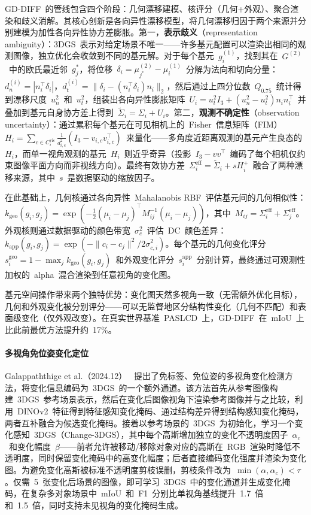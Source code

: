 GD-DIFF~的管线包含四个阶段：几何漂移建模、核评分（几何+外观）、聚合渲染和歧义消解。其核心创新是各向异性漂移模型，将几何漂移归因于两个来源并分别建模为加性各向异性协方差膨胀。第一，\textbf{表示歧义}（representation ambiguity）：3DGS~表示对给定场景不唯一——许多基元配置可以渲染出相同的观测图像，独立优化会收敛到不同的基元解。对于每个基元~$g_i^{(1)}$，找到其在~$G^{(2)}$~中的欧氏最近邻~$g_j^*$，将位移~$\delta_i = \mu_{j^*}^{(2)} - \mu_i^{(1)}$~分解为法向和切向分量：$d_n^{(i)} = |n_i^\top \delta_i|$，$d_t^{(i)} = \|\delta_i - (n_i^\top \delta_i)n_i\|_2$，然后通过上四分位数~$Q_{0.75}$~统计得到漂移尺度~$u_n^2$~和~$u_t^2$，组装出各向异性膨胀矩阵~$U_i = u_t^2 I_3 + (u_n^2 - u_t^2)n_i n_i^\top$~并叠加到基元自身协方差上得到~$\tilde{\Sigma}_i = \Sigma_i + U_i$。第二，\textbf{观测不确定性}（observation uncertainty）：通过累积每个基元在可见相机上的~Fisher~信息矩阵（FIM）~$H_i = \sum_{c \in C_i^{\text{vis}}} \frac{1}{d_{i,c}^2}(I_3 - v_{i,c}v_{i,c}^\top)$~来量化——多角度近距离观测的基元产生良态的~$H_i$，而单一视角观测的基元~$H_i$~则近乎奇异（投影~$I_3 - vv^\top$~编码了每个相机仅约束图像平面方向而非视线方向）。最终有效协方差~$\Sigma_i^{\text{eff}} = \tilde{\Sigma}_i + sH_i^+$~融合了两种漂移来源，其中~$s$~是数据驱动的缩放因子。

在此基础上，几何核通过各向异性~Mahalanobis RBF~评估基元间的几何相似性：$k_\text{geo}(g_i, g_j) = \exp(-\frac{1}{2}(\mu_i - \mu_j)^\top M_{ij}^{-1}(\mu_i - \mu_j))$，其中~$M_{ij} = \Sigma_i^{\text{eff}} + \Sigma_j^{\text{eff}}$。外观核则通过数据驱动的颜色带宽~$\sigma_c^2$~评估~DC~颜色差异：$k_\text{app}(g_i, g_j) = \exp(-\|c_i - c_j\|^2 / 2\sigma_{c,i}^2)$。每个基元的几何变化评分~$s_i^\text{geo} = 1 - \max_j k_\text{geo}(g_i, g_j)$~和外观变化评分~$s_i^\text{app}$~分别计算，最终通过可观测性加权的~alpha~混合渲染到任意视角的变化图。

基元空间操作带来两个独特优势：变化图天然多视角一致（无需额外优化目标），几何和外观变化被分别评分——可以无监督地区分结构性变化（几何不匹配）和表面级变化（仅外观改变）。在真实世界基准~PASLCD~上，GD-DIFF~在~mIoU~上比此前最优方法提升约~17\%。

\paragraph{多视角免位姿变化定位}

Galappaththige et al.（2024.12）~\cite{2412_03911} 提出了免标签、免位姿的多视角变化检测方法，将变化信息编码为~3DGS~的一个额外通道。该方法首先从参考图像构建~3DGS~参考场景表示，然后在变化后图像视角下渲染参考图像并与之比较，利用~DINOv2~特征得到特征感知变化掩码、通过结构差异得到结构感知变化掩码，两者互补融合为候选变化掩码。接着以参考场景的~3DGS~为初始化，学习一个变化感知~3DGS（Change-3DGS），其中每个高斯增加独立的变化不透明度因子~$\alpha_c$~和变化幅度~$\beta$——前者允许被移动/移除对象对应的高斯在~RGB~渲染时降低不透明度，同时保留变化掩码中的高变化幅度；后者直接编码变化强度并渲染为变化图。为避免变化高斯被标准不透明度剪枝误删，剪枝条件改为~$\min(\alpha, \alpha_c) < \tau$。仅需~5~张变化后场景的图像，即可学习~3DGS~中的变化通道并生成变化掩码，在复杂多对象场景中~mIoU~和~F1~分别比单视角基线提升~1.7~倍和~1.5~倍，同时支持未见视角的变化掩码生成。


